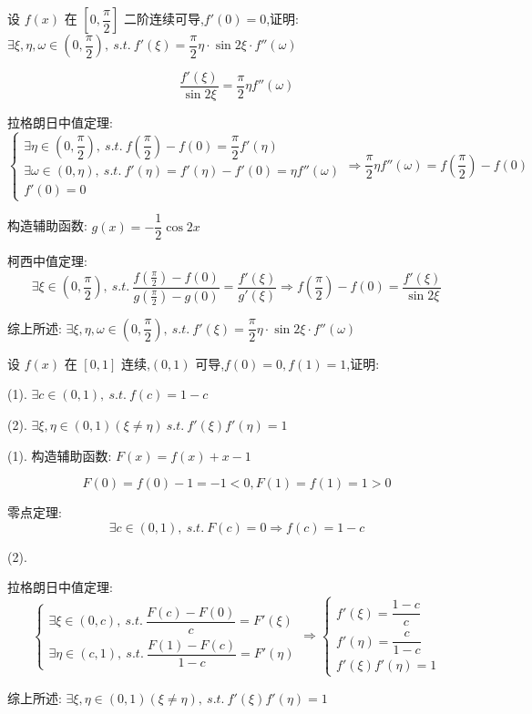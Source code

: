 \begin{proposition}
	设 $f(x)$ 在 $[0,\dfrac{\pi}{2}]$ 二阶连续可导,$f'(0)=0$,证明: $\exists \xi,\eta,\omega\in(0,\dfrac{\pi}{2}),\ s.t.\ f'(\xi)=\dfrac{\pi}{2}\eta\cdot \sin 2\xi\cdot f''(\omega)$
\end{proposition}
\begin{solution}

	$$\dfrac{f'(\xi)}{\sin 2\xi}=\dfrac{\pi}{2}\eta f''(\omega)$$

	拉格朗日中值定理:
	$$\begin{cases}
		\exists \eta\in(0,\dfrac{\pi}{2}),\ s.t.\ f(\dfrac{\pi}{2})-f(0)=\dfrac{\pi}{2}f'(\eta)\\
		\exists \omega\in(0,\eta),\ s.t.\ f'(\eta)=f'(\eta)-f'(0)=\eta f''(\omega)\\
		f'(0) = 0
	\end{cases}\Rightarrow \dfrac{\pi}{2}\eta f''(\omega) = f(\dfrac{\pi}{2}) - f(0)$$

	构造辅助函数: $g(x)=-\dfrac{1}{2}\cos 2x$

	柯西中值定理:
	$$\exists\xi\in(0,\dfrac{\pi}{2}),\ s.t.\ \dfrac{f(\frac{\pi}{2})-f(0)}{g(\frac{\pi}{2})-g(0)}=\dfrac{f'(\xi)}{g'(\xi)}\Rightarrow f(\frac{\pi}{2})-f(0)=\dfrac{f'(\xi)}{\sin 2\xi}$$

	综上所述: $\exists \xi,\eta,\omega\in(0,\dfrac{\pi}{2}),\ s.t.\ f'(\xi)=\dfrac{\pi}{2}\eta\cdot \sin 2\xi\cdot f''(\omega)$
\end{solution}

\begin{proposition}
	设 $f(x)$ 在 $[0,1]$ 连续,$(0,1)$ 可导,$f(0)=0,f(1)=1$,证明:

	(1). $\exists c\in(0,1),\ s.t.\ f(c)=1-c$

	(2). $\exists \xi,\eta\in(0,1)(\xi\neq \eta)\ s.t.\ f'(\xi)f'(\eta)=1$
\end{proposition}
\begin{solution}

	(1). 构造辅助函数: $F(x)=f(x)+x-1$

	$$F(0)=f(0)-1=-1<0, F(1)= f(1) = 1 > 0$$

	零点定理:
	$$\exists c\in(0,1),\ s.t.\ F(c)=0\Rightarrow f(c)=1-c$$

	(2). 
	
	拉格朗日中值定理:
	$$\begin{cases}
		\exists \xi\in(0,c),\ s.t.\ \dfrac{F(c)-F(0)}{c}=F'(\xi)\\
		\exists \eta\in(c,1),\ s.t.\ \dfrac{F(1)-F(c)}{1-c}=F'(\eta)
	\end{cases}\Rightarrow
	\begin{cases}
		f'(\xi) = \dfrac{1-c}{c}\\
		f'(\eta) = \dfrac{c}{1-c}\\
		f'(\xi)f'(\eta) = 1
	\end{cases}$$

	综上所述: $\exists \xi,\eta\in(0,1)(\xi\neq \eta),\ s.t.\ f'(\xi)f'(\eta)=1$
\end{solution}


